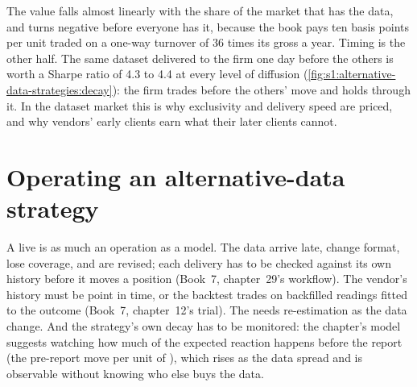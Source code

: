 The value falls almost linearly with the share of the market that has the data, and turns negative before everyone has it, because the book pays ten
basis points per unit traded on a one-way turnover of 36 times its gross a year. Timing is the other half. The same dataset delivered to the firm one day before the others is
worth a Sharpe ratio of 4.3 to 4.4 at every level of diffusion (\cref{fig:s1:alternative-data-strategies:decay}): the firm trades before the others' move
and holds through it. In the dataset market this is why exclusivity and delivery speed are priced, and why vendors' early clients earn what their later
clients cannot.

\begin{omfigure}

\label{fig:s1:alternative-data-strategies:decay}
\end{omfigure}

\section{Operating an alternative-data strategy}

A live  is as much an operation as a model. The data arrive late, change format, lose coverage, and are revised; each delivery
has to be checked against its own history before it moves a position (Book~7, chapter~29's workflow). The vendor's history must be point in time, or the
backtest trades on backfilled readings fitted to the outcome (Book~7, chapter~12's trial). The  needs re-estimation as the data change. And the
strategy's own decay has to be monitored: the chapter's model suggests watching how much of the expected reaction happens before the report (the
pre-report move per unit of ), which rises as the data spread and is observable without knowing who else buys the data.

